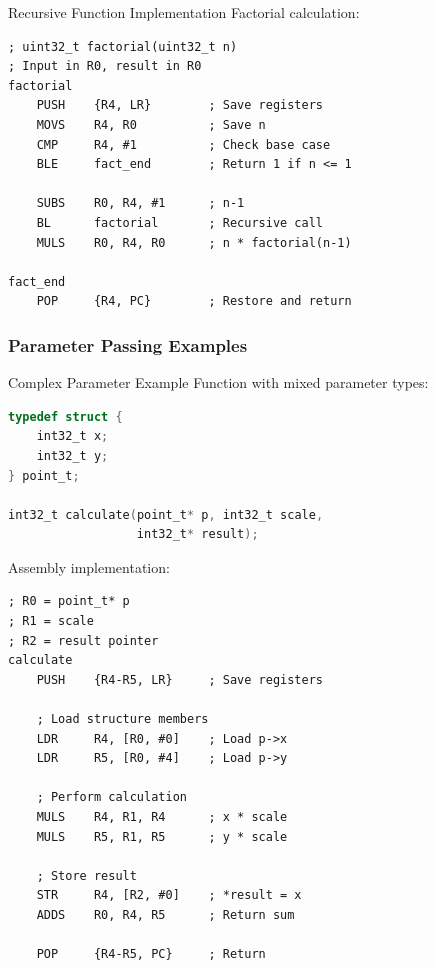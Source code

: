 \begin{example2}{Recursive Function Implementation}
Factorial calculation:
\begin{lstlisting}[language=armasm, style=basesmol]
; uint32_t factorial(uint32_t n)
; Input in R0, result in R0
factorial
    PUSH    {R4, LR}        ; Save registers
    MOVS    R4, R0          ; Save n
    CMP     R4, #1          ; Check base case
    BLE     fact_end        ; Return 1 if n <= 1
    
    SUBS    R0, R4, #1      ; n-1
    BL      factorial       ; Recursive call
    MULS    R0, R4, R0      ; n * factorial(n-1)
    
fact_end
    POP     {R4, PC}        ; Restore and return
\end{lstlisting}
\end{example2}


\subsubsection{Parameter Passing Examples}

\begin{example2}{Complex Parameter Example}
Function with mixed parameter types:
\begin{lstlisting}[language=C, style=basesmol]
typedef struct {
    int32_t x;
    int32_t y;
} point_t;

int32_t calculate(point_t* p, int32_t scale, 
                  int32_t* result);
\end{lstlisting}

Assembly implementation:
\begin{lstlisting}[language=armasm, style=basesmol]
; R0 = point_t* p
; R1 = scale
; R2 = result pointer
calculate
    PUSH    {R4-R5, LR}     ; Save registers
    
    ; Load structure members
    LDR     R4, [R0, #0]    ; Load p->x
    LDR     R5, [R0, #4]    ; Load p->y
    
    ; Perform calculation
    MULS    R4, R1, R4      ; x * scale
    MULS    R5, R1, R5      ; y * scale
    
    ; Store result
    STR     R4, [R2, #0]    ; *result = x
    ADDS    R0, R4, R5      ; Return sum
    
    POP     {R4-R5, PC}     ; Return
\end{lstlisting}
\end{example2}



